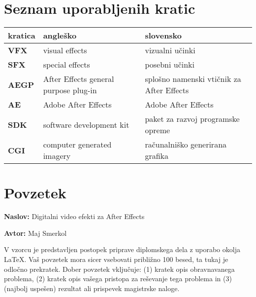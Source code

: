 \documentclass[a4paper, 12pt]{book}
\newcommand{\ttitle}{Digitalni video efekti za After Effects}
\newcommand{\tauthor}{Maj Smerkol}
\newcommand{\clearemptydoublepage}{\newpage{\pagestyle{empty}\cleardoublepage}}
\begin{document}
\clearemptydoublepage


\chapter*{Seznam uporabljenih kratic}  %

\noindent\begin{tabular}{p{}|p{}|p{}}    %
  {\bf kratica} & {\bf angleško}              				& {\bf slovensko} \\ \hline
  {\bf VFX}      & visual effects               				& vizualni učinki \\
  {\bf SFX}      & special effects              				& posebni učinki \\
  {\bf AEGP}   & After Effects general purpose plug-in 	& splošno namenski vtičnik za After Effects \\
  {\bf AE}       & Adobe After Effects 				&  Adobe After Effects \\
  {\bf SDK}     & software development kit 			&  paket za razvoj programske opreme \\
  {\bf CGI}	& computer generated imagery			& računalniško generirana grafika \\

\end{tabular}


\clearemptydoublepage

\chapter*{Povzetek}

\noindent\textbf{Naslov:} \ttitle
\bigskip

\noindent\textbf{Avtor:} \tauthor
\bigskip

\noindent V vzorcu je predstavljen postopek priprave diplomskega dela z uporabo okolja \LaTeX. Vaš povzetek mora sicer vsebovati približno 100 besed, ta tukaj je odločno prekratek.
Dober povzetek vključuje: (1) kratek opis obravnavanega problema, (2) kratek opis vašega pristopa za reševanje tega problema in (3) (najbolj uspešen) rezultat ali prispevek magistrske naloge.
\end{document}
